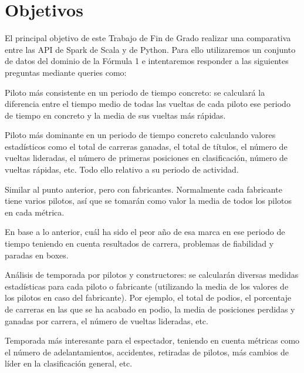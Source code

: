 \documentclass[12pt,twoside,titlepage]{report}
\newcommand\blankpage{%
    \newpage
    \null
    \thispagestyle{empty}%
    \newpage}
\begin{document}







\chapter{Objetivos}
\newpage

El principal objetivo de este Trabajo de Fin de Grado realizar una comparativa entre las API de Spark de Scala y de Python. Para ello utilizaremos un conjunto de datos del dominio de la Fórmula 1 e intentaremos responder a las siguientes preguntas mediante queries como:

\begin{compactitem}
  \item Piloto más consistente en un periodo de tiempo concreto: se calculará la diferencia entre el tiempo medio de todas las vueltas de cada piloto ese periodo de tiempo en concreto y la media de sus vueltas más rápidas.
  \item Piloto más dominante en un periodo de tiempo concreto calculando valores estadísticos como el total de carreras ganadas, el total de títulos, el número de vueltas lideradas, el número de primeras posiciones en clasificación, número de vueltas rápidas, etc. Todo ello relativo a su periodo de actividad.
  \item Similar al punto anterior, pero con fabricantes. Normalmente cada fabricante tiene varios pilotos, así que se tomarán como valor la media de todos los pilotos en cada métrica.
  \item En base a lo anterior, cuál ha sido el peor año de esa marca en ese periodo de tiempo teniendo en cuenta resultados de carrera, problemas de fiabilidad y paradas en boxes.
  \item Análisis de temporada por pilotos y constructores: se calcularán diversas medidas estadísticas para cada piloto o fabricante (utilizando la media de los valores de los pilotos en caso del fabricante). Por ejemplo, el total de podios, el porcentaje de carreras en las que se ha acabado en podio, la media de posiciones perdidas y ganadas por carrera, el número de vueltas lideradas, etc.
  \item Temporada más interesante para el espectador, teniendo en cuenta métricas como el número de adelantamientos, accidentes, retiradas de pilotos, más cambios de líder en la clasificación general, etc.
\end{compactitem}
\end{document}
